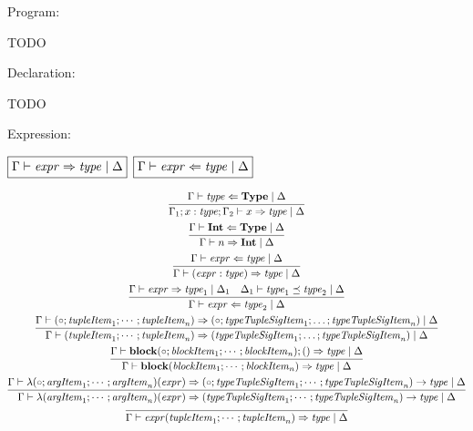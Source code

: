 Program:

TODO

Declaration:

TODO

Expression:

$\fbox{$\Gamma \vdash \mathit{expr} \Rightarrow \mathit{type} \mid \Delta$}$
$\fbox{$\Gamma \vdash \mathit{expr} \Leftarrow \mathit{type} \mid \Delta$}$

\begin{gather*}
  \infer{\Gamma_1; x: \mathit{type}; \Gamma_2 \vdash x \Rightarrow \mathit{type} \mid \Delta}{
    \Gamma \vdash \mathit{type} \Leftarrow \mathbf{Type} \mid \Delta
  }
  \\
  \infer{\Gamma \vdash n \Rightarrow \mathbf{Int} \mid \Delta}{
    \Gamma \vdash \mathbf{Int} \Leftarrow \mathbf{Type} \mid \Delta
  }
  \\
  \infer{\Gamma \vdash (\mathit{expr}: \mathit{type}) \Rightarrow \mathit{type} \mid \Delta}{
    \Gamma \vdash \mathit{expr} \Leftarrow \mathit{type} \mid \Delta
  }
  \\
  \infer{\Gamma \vdash \mathit{expr} \Leftarrow \mathit{type}_2 \mid \Delta}{
    \Gamma \vdash \mathit{expr} \Rightarrow \mathit{type}_1 \mid \Delta_1
    &
    \Delta_1 \vdash \mathit{type}_1 \preceq \mathit{type}_2 \mid \Delta
  }
  \\
  \infer{\Gamma \vdash (\mathit{tupleItem}_1; \cdots; \mathit{tupleItem}_n) \Rightarrow (\mathit{typeTupleSigItem}_1; \ldots; \mathit{typeTupleSigItem}_n) \mid \Delta}{
    \Gamma \vdash (\circ; \mathit{tupleItem}_1; \cdots; \mathit{tupleItem}_n) \Rightarrow (\circ; \mathit{typeTupleSigItem}_1; \ldots; \mathit{typeTupleSigItem}_n) \mid \Delta
  }
  \\
  \infer{\Gamma \vdash \mathbf{block}(\mathit{blockItem}_1; \cdots; \mathit{blockItem}_n) \Rightarrow \mathit{type} \mid \Delta}{
    \Gamma \vdash \mathbf{block}(\circ; \mathit{blockItem}_1; \cdots; \mathit{blockItem}_n); () \Rightarrow \mathit{type} \mid \Delta
  }
  \\
  \infer{\Gamma \vdash \lambda(\mathit{argItem}_1; \cdots; \mathit{argItem}_n)(\mathit{expr}) \Rightarrow (\mathit{typeTupleSigItem}_1; \cdots; \mathit{typeTupleSigItem}_n) \rightarrow \mathit{type} \mid \Delta}{
    \Gamma \vdash \lambda(\circ; \mathit{argItem}_1; \cdots; \mathit{argItem}_n)(\mathit{expr}) \Rightarrow (\circ; \mathit{typeTupleSigItem}_1; \cdots; \mathit{typeTupleSigItem}_n) \rightarrow \mathit{type} \mid \Delta
  }
  \\
  \infer{\Gamma \vdash \mathit{expr}(\mathit{tupleItem}_1; \cdots; \mathit{tupleItem}_n) \Rightarrow \mathit{type} \mid \Delta}{
}
\end{gather*}
